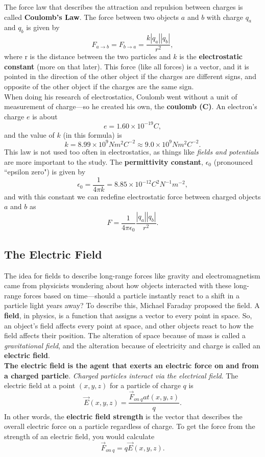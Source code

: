 \documentclass[12pt,letterpaper]{article}
\begin{document}
The force law that describes the attraction and repulsion between charges is called \textbf{Coulomb's Law}. The force between two objects $a$ and $b$ with charge $q_{a}$ and $q_{b}$ is given by $$F_{a \rightarrow b} = F_{b \rightarrow a} = \frac{k |q_{a}| |q_{b}|}{r^{2}},$$ where r is the distance between the two particles and $k$ is the \textbf{electrostatic constant} (more on that later). This force (like all forces) is a vector, and it is pointed in the direction of the other object if the charges are different signs, and opposite of the other object if the charges are the same sign. \\

When doing his research of electrostatics, Coulomb went without a unit of measurement of charge---so he created his own, the \textbf{coulomb (C)}. An electron's charge $e$ is about $$e = 1.60 \times 10^{-19} C,$$ and the value of $k$ (in this formula) is $$k = 8.99 \times 10^{9} N m^{2} C^{-2} \approx 9.0 \times 10^{9} N m^{2} C^{-2}.$$ This law is not used too often in electrostatics, as things like \textit{fields and potentials} are more important to the study. The \textbf{permittivity constant}, $\epsilon_{0}$ (pronounced ``epsilon zero") is given by $$\epsilon_{0} = \frac{1}{4\pi k} = 8.85 \times 10^{-12} C^{2} N^{-1} m^{-2},$$ and with this constant we can redefine electrostatic force between charged objects $a$ and $b$ as $$F = \frac{1}{4\pi\epsilon_{0}} \frac{|q_{a}| |q_{b}|}{r^{2}}.$$

\subsection{The Electric Field}

The idea for fields to describe long-range forces like gravity and electromagnetism came from physicists wondering about how objects interacted with these long-range forces based on time---should a particle instantly react to a shift in a particle light years away? To describe this, Michael Faraday proposed the field. A \textbf{field}, in physics, is a function that assigns a vector to every point in space. So, an object's field affects every point at space, and other objects react to how the field affects their position. The alteration of space because of mass is called a \textit{gravitational field}, and the alteration because of electricity and charge is called an \textbf{electric field}. \\

\textbf{The electric field is the agent that exerts an electric force on and from a charged particle}. \textit{Charged particles interact via the electrical field}. The electric field at a point $(x, y, z)$  for a particle of charge $q$ is $$\vec{E}(x, y, z) = \frac{\vec{F}_{on\ q} at (x, y,z)}{q}.$$ In other words, the \textbf{electric field strength} is the vector that describes the overall electric force on a particle regardless of charge. To get the force from the strength of an electric field, you would calculate $$\vec{F}_{on\ q} = q\vec{E}(x, y, z).$$ \\
\end{document}
